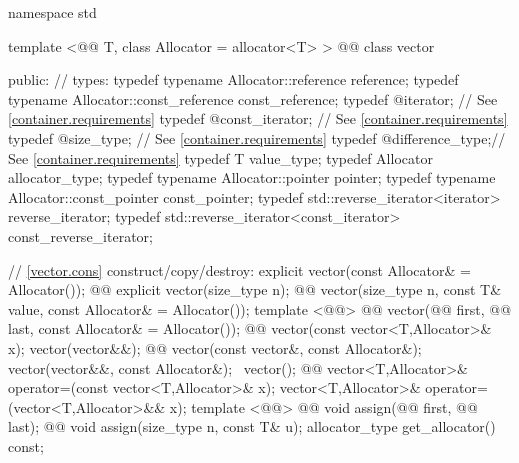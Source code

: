 \documentclass[american,twoside]{book}
\begin{document}
\begin{codeblock}
namespace std {
  template <@@ T, class Allocator = allocator<T> >
  @@
  class vector {
  public:
    // types:
    typedef typename Allocator::reference         reference;
    typedef typename Allocator::const_reference   const_reference;
    typedef @\impdef@                iterator;       // See \ref{container.requirements}
    typedef @\impdef@                const_iterator; // See \ref{container.requirements}
    typedef @\impdef@                size_type;      // See \ref{container.requirements}
    typedef @\impdef@                difference_type;// See \ref{container.requirements}
    typedef T                                     value_type;
    typedef Allocator                             allocator_type;
    typedef typename Allocator::pointer           pointer;
    typedef typename Allocator::const_pointer     const_pointer;
    typedef std::reverse_iterator<iterator>       reverse_iterator;
    typedef std::reverse_iterator<const_iterator> const_reverse_iterator;

    // \ref{vector.cons} construct/copy/destroy:
    explicit vector(const Allocator& = Allocator());
    @@ explicit vector(size_type n);
    @@ vector(size_type n, const T& value, const Allocator& = Allocator());
    template <@@>
      @@
      vector(@@ first, @@ last,
             const Allocator& = Allocator());
    @@ vector(const vector<T,Allocator>& x);
    vector(vector&&);
    @@ vector(const vector&, const Allocator&);
    vector(vector&&, const Allocator&);
   ~vector();
    @@ vector<T,Allocator>& operator=(const vector<T,Allocator>& x);
    vector<T,Allocator>& operator=(vector<T,Allocator>&& x);
    template <@@>
      @@
      void assign(@@ first, @@ last);
    @@ void assign(size_type n, const T& u);
    allocator_type get_allocator() const;

}}
\end{codeblock}
\end{document}
